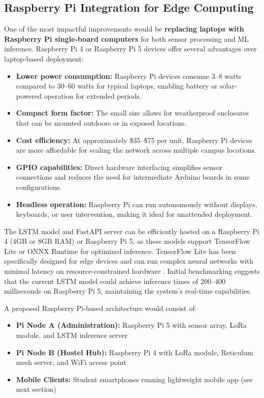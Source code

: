 \subsection{Raspberry Pi Integration for Edge Computing}
One of the most impactful improvements would be \textbf{replacing laptops with Raspberry Pi single-board computers} for both sensor processing and ML inference. Raspberry Pi 4 or Raspberry Pi 5 devices offer several advantages over laptop-based deployment:
\begin{itemize}
    \item \textbf{Lower power consumption:} Raspberry Pi devices consume 3–8 watts compared to 30–60 watts for typical laptops, enabling battery or solar-powered operation for extended periods.
    \item \textbf{Compact form factor:} The small size allows for weatherproof enclosures that can be mounted outdoors or in exposed locations.
    \item \textbf{Cost efficiency:} At approximately \$35–\$75 per unit, Raspberry Pi devices are more affordable for scaling the network across multiple campus locations.
    \item \textbf{GPIO capabilities:} Direct hardware interfacing simplifies sensor connections and reduces the need for intermediate Arduino boards in some configurations.
    \item \textbf{Headless operation:} Raspberry Pi can run autonomously without displays, keyboards, or user intervention, making it ideal for unattended deployment.
\end{itemize}

The LSTM model and FastAPI server can be efficiently hosted on a Raspberry Pi 4 (4GB or 8GB RAM) or Raspberry Pi 5, as these models support TensorFlow Lite or ONNX Runtime for optimized inference. TensorFlow Lite has been specifically designed for edge devices and can run complex neural networks with minimal latency on resource-constrained hardware \cite{abadi2016tensorflow}. Initial benchmarking suggests that the current LSTM model could achieve inference times of 200–400 milliseconds on Raspberry Pi 5, maintaining the system's real-time capabilities.

A proposed Raspberry Pi-based architecture would consist of:
\begin{itemize}
    \item \textbf{Pi Node A (Administration):} Raspberry Pi 5 with sensor array, LoRa module, and LSTM inference server
    \item \textbf{Pi Node B (Hostel Hub):} Raspberry Pi 4 with LoRa module, Reticulum mesh server, and WiFi access point
    \item \textbf{Mobile Clients:} Student smartphones running lightweight mobile app (see next section)
\end{itemize}

